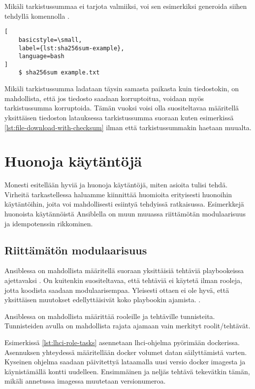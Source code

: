 

Mikäli tarkistussummaa ei tarjota valmiiksi, voi sen esimerkiksi generoida siihen tehdyllä
komennolla \parencite{Sha256sumManPage}.

\begin{lstlisting}[
    basicstyle=\small,
    label={lst:sha256sum-example},
    language=bash
]
    $ sha256sum example.txt
\end{lstlisting}

Mikäli tarkistussumma ladataan täysin samasta paikasta kuin tiedostokin, on mahdollista, että
jos tiedosto saadaan korruptoitua, voidaan myös tarkistussumma korruptoida. Tämän vuoksi voisi
olla suositeltavaa määritellä yksittäisen tiedoston latauksessa tarkistussumma suoraan kuten
esimerkissä \ref{lst:file-download-with-checksum} ilman että tarkistussummakin haetaan muualta.

\section{Huonoja käytäntöjä}

Monesti esitellään hyviä ja huonoja käytäntöjä, miten asioita tulisi tehdä. Virheitä
tarkastellessa haluamme kiinnittää huomioita erityisesti huonoihin käytäntöihin, joita
voi mahdollisesti esiintyä tehdyissä ratkaisussa. Esimerkkejä huonoista käytännöistä
Ansiblella on muun muuassa riittämötän modulaarisuus ja idempotenssin rikkominen.

\subsection{Riittämätön modulaarisuus}

Ansiblessa on mahdollista määritellä suoraan yksittäisiä tehtäviä playbookeissa ajettavaksi
\parencite{AnsibleDocs}. On kuitenkin suositeltavaa, että tehtäviä ei käytetä ilman rooleja,
jotta koodista saadaan modulaarisempaa. Yleisesti ottaen ei ole hyvä, että yksittäisen
muutokset edellyttäisivät koko playbookin ajamista. \parencite{KumaraIndika2021Tdad}.

Ansiblessa on mahdollista määrittää rooleille ja tehtäville tunnisteita. Tunnisteiden
avulla on mahdollista rajata ajamaan vain merkityt roolit/tehtävät. \parencite{AnsibleDocs}

Esimerkissä \ref{lst:lhci-role-tasks} asennetaan lhci-ohjelma pyörimään dockerissa. Asennuksen
yhteydessä määritellään docker volumet datan säilyttämistä varten. Kyseinen ohjelma saadaan
päivitettyä lataamalla uusi versio docker imagesta ja käynistämällä kontti uudelleen.
Ensimmäinen ja neljäs tehtävä tekevätkin tämän, mikäli annetussa imagessa muutetaan
versionumeroa.

